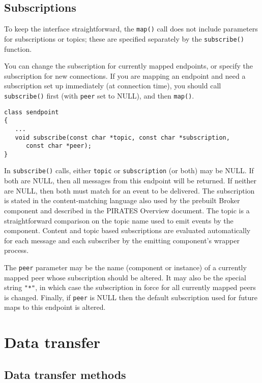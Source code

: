 \documentclass[12pt,a4paper,twoside]{article}
\renewcommand{\_}{\texttt{\symbol{95}}}
\begin{document}
\subsection{Subscriptions}

To keep the interface straightforward, the \verb^map()^ call does not
include parameters for subscriptions or topics; these are
specified separately by the \verb^subscribe()^ function.

You can change the subscription for currently mapped endpoints,
or specify the subscription for new connections. If you are
mapping an endpoint and need a subscription set up immediately
(at connection time), you should call \verb^subscribe()^ first
(with \verb^peer^ set to NULL), and then \verb^map()^.

\begin{verbatim}
class sendpoint
{
   ...
   void subscribe(const char *topic, const char *subscription,
      const char *peer);
}
\end{verbatim}

In \verb^subscribe()^ calls, either \verb^topic^ or \verb^subscription^
(or both) may be NULL. If both are NULL, then all messages from this
endpoint will be returned. If neither are NULL, then both must match
for an event to be delivered. The subscription is stated in the
content-matching language also used by the prebuilt Broker component
and described in the PIRATES Overview document.
The topic is a straightforward comparison on the topic name used to emit
events by the component. Content and topic based subscriptions are evaluated
automatically for each message and each subscriber by the emitting
component's wrapper process.

The \verb^peer^ parameter may be the name (component or instance)
of a currently mapped peer whose subscription should be altered.
It may also be the special string \verb^"*"^, in which case
the subscription in force for all currently mapped peers is changed.
Finally, if \verb^peer^ is NULL then the default subscription
used for future maps to this endpoint is altered.

\section{Data transfer}

\subsection{Data transfer methods}
\end{document}
